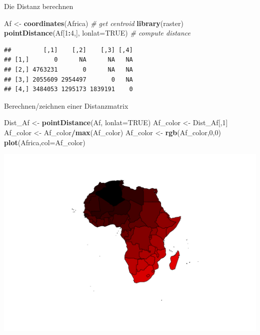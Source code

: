 \documentclass[ignorenonframetext,]{beamer}
\newenvironment{Shaded}{\begin{snugshade}}{\end{snugshade}}
\newcommand{\CommentTok}[1]{\textcolor[rgb]{0.56,0.35,0.01}{\textit{#1}}}
\newcommand{\DataTypeTok}[1]{\textcolor[rgb]{0.13,0.29,0.53}{#1}}
\newcommand{\DecValTok}[1]{\textcolor[rgb]{0.00,0.00,0.81}{#1}}
\newcommand{\KeywordTok}[1]{\textcolor[rgb]{0.13,0.29,0.53}{\textbf{#1}}}
\newcommand{\NormalTok}[1]{#1}
\newcommand{\OperatorTok}[1]{\textcolor[rgb]{0.81,0.36,0.00}{\textbf{#1}}}
\newcommand{\OtherTok}[1]{\textcolor[rgb]{0.56,0.35,0.01}{#1}}
\newcommand{\StringTok}[1]{\textcolor[rgb]{0.31,0.60,0.02}{#1}}
\begin{document}
\begin{frame}[fragile]{Die Distanz berechnen}
\protect\hypertarget{die-distanz-berechnen}{}

\begin{Shaded}
\begin{Highlighting}[]
\NormalTok{Af <-}\StringTok{ }\KeywordTok{coordinates}\NormalTok{(Africa) }\CommentTok{# get centroid}
\KeywordTok{library}\NormalTok{(raster)}
\KeywordTok{pointDistance}\NormalTok{(Af[}\DecValTok{1}\OperatorTok{:}\DecValTok{4}\NormalTok{,], }\DataTypeTok{lonlat=}\OtherTok{TRUE}\NormalTok{) }\CommentTok{# compute distance}
\end{Highlighting}
\end{Shaded}

\begin{verbatim}
##         [,1]    [,2]    [,3] [,4]
## [1,]       0      NA      NA   NA
## [2,] 4763231       0      NA   NA
## [3,] 2055609 2954497       0   NA
## [4,] 3484053 1295173 1839191    0
\end{verbatim}

\end{frame}

\begin{frame}[fragile]{Berechnen/zeichnen einer Distanzmatrix}
\protect\hypertarget{berechnenzeichnen-einer-distanzmatrix}{}

\begin{Shaded}
\begin{Highlighting}[]
\NormalTok{Dist_Af <-}\StringTok{ }\KeywordTok{pointDistance}\NormalTok{(Af, }\DataTypeTok{lonlat=}\OtherTok{TRUE}\NormalTok{)}
\NormalTok{Af_color <-}\StringTok{ }\NormalTok{Dist_Af[,}\DecValTok{1}\NormalTok{]}
\NormalTok{Af_color <-}\StringTok{ }\NormalTok{Af_color}\OperatorTok{/}\KeywordTok{max}\NormalTok{(Af_color)}
\NormalTok{Af_color <-}\StringTok{ }\KeywordTok{rgb}\NormalTok{(Af_color,}\DecValTok{0}\NormalTok{,}\DecValTok{0}\NormalTok{)}
\KeywordTok{plot}\NormalTok{(Africa,}\DataTypeTok{col=}\NormalTok{Af_color)}
\end{Highlighting}
\end{Shaded}

\includegraphics{A7_spdep_files/figure-beamer/Africa Distance-1.pdf}

\end{frame}
\end{document}
